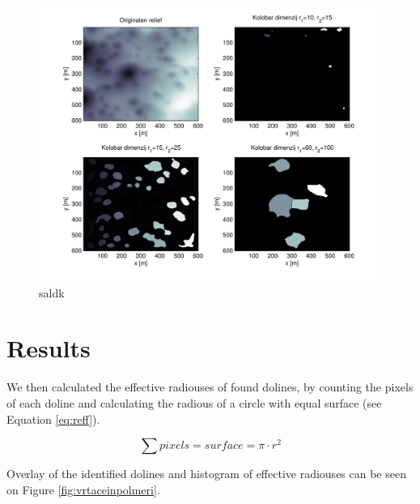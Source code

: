 \documentclass[a0,portrait]{a0poster}
\begin{document}
\begin{multicols}{2}
\begin{minipage}[b]{0.5\textwidth}
\begin{minipage}{0.45\linewidth}
\begin{figure}[H]
              \includegraphics[width=\textwidth]{concavity-segmentation-samples.pdf}
              \caption{saldk}
              \label{fig:concavity-segmentation}
          \end{figure}
      \end{minipage}
	\end{minipage}


\section*{Results}

We then calculated the effective radiouses of found dolines, by counting the pixels of each doline and calculating the radious of a circle with equal surface (see Equation \ref{eq:reff}).

\begin{equation}
	\sum pixels = surface = \pi \cdot r^2
	\label{eq:reff}
\end{equation}

Overlay of the identified dolines and histogram of effective radiouses can be seen on Figure \ref{fig:vrtaceinpolmeri}.


\end{multicols}
\end{document}
